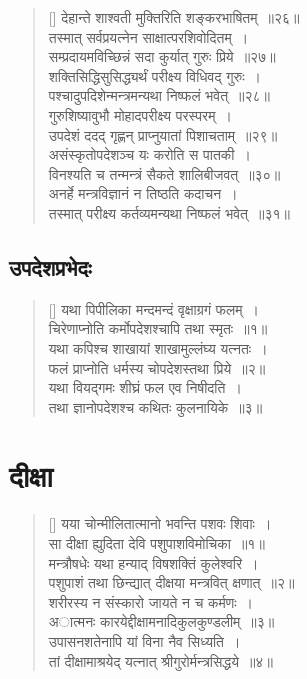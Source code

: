 \documentclass[twoside,12pt,notitlepage]{book}
\begin{document}
\begin{verse}[\versewidth]
देहान्ते शाश्वती मुक्तिरिति शङ्करभाषितम्~॥२६॥\\
तस्मात् सर्वप्रयत्नेन साक्षात्परशिवोदितम्~।\\[-6pt]
सम्प्रदायमविच्छिन्नं सदा कुर्यात् गुरुः प्रिये~॥२७॥\\
शक्तिसिद्धिसुसिद्ध्यर्थं परीक्ष्य विधिवद् गुरुः~।\\[-6pt]
पश्चादुपदिशेन्मन्त्रमन्यथा निष्फलं भवेत्~॥२८॥\\
गुरुशिष्यावुभौ मोहादपरीक्ष्य परस्परम्~।\\[-6pt]
उपदेशं ददद् गृह्णन् प्राप्नुयातां पिशाचताम्~॥२९॥\\
असंस्कृतोपदेशञ्च यः करोति स पातकी~।\\[-6pt]
विनश्यति च तन्मन्त्रं सैकते शालिबीजवत्~॥३०॥\\
अनर्हे मन्त्रविज्ञानं न तिष्ठति कदाचन~।\\[-6pt]
तस्मात् परीक्ष्य कर्तव्यमन्यथा निष्फलं भवेत्~॥३१॥
\end{verse}

\subsection*{उपदेशप्रभेदः}
\begin{verse}[\versewidth]
यथा पिपीलिका मन्दमन्दं वृक्षाग्रगं फलम्~।\\[-6pt]
चिरेणाप्नोति कर्मोपदेशश्चापि तथा स्मृतः~॥१॥\\
यथा कपिश्च शाखायां शाखामुल्लंघ्य यत्नतः~।\\[-6pt]
फलं प्राप्नोति धर्मस्य चोपदेशस्तथा प्रिये~॥२॥\\
यथा वियद्गमः शीघ्रं फल एव निषीदति~।\\[-6pt]
तथा ज्ञानोपदेशश्च कथितः कुलनायिके~॥३॥\footA \\ 
\end{verse}

\section{दीक्षा}
\begin{verse}[\versewidth]
यया चोन्मीलितात्मानो भवन्ति पशवः शिवाः~।\\[-6pt]
सा दीक्षा ह्युदिता देवि पशुपाशविमोचिका~॥१॥\\
मन्त्रौषधेः यथा हन्याद् विषशक्तिं कुलेश्वरि~। \\[-6pt]
पशुपाशं तथा छिन्द्यात् दीक्षया मन्त्रवित् क्षणात्~॥२॥ \\[-6pt]
 शरीरस्य न संस्कारो जायते न च कर्मणः~।\\[-6pt]
 अात्मनः कारयेद्दीक्षामनादिकुलकुण्डलीम्~॥३॥\\
 उपासनशतेनापि यां विना नैव सिध्यति~।\\[-6pt]
 तां दीक्षामाश्रयेद् यत्नात् श्रीगुरोर्मन्त्रसिद्धये~॥४॥
 \end{verse}
 
\end{document}
